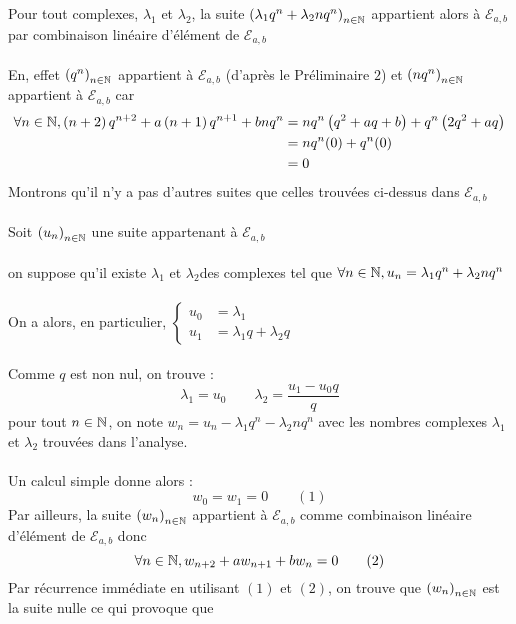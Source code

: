\begin{dem}
\begin{itemize}
        Pour tout complexes, \(\lambda_1\) et \(\lambda_2\), la suite \(\left(\lambda_1 q^n + \lambda_2 n q^n\right)_{n \in \mathbb{N}}\) appartient alors à \(\mathcal{E}_{a,b}\) par combinaison linéaire d'élément de \(\mathcal{E}_{a,b}\)\\~\\
        En, effet \(\left(q^n\right)_{n\in \mathbb{N}}\) appartient à \(\mathcal{E}_{a,b}\) (d'après le Préliminaire \(2\)) et \(\left(nq^n\right)_{n \in \mathbb{N}}\) appartient à \(\mathcal{E}_{a,b}\) car 
        \begin{align*}
            \forall n \in \mathbb{N}, \left(n+2\right)q^{n+2}+a\left(n+1\right)q^{n+1} + bnq^n &= nq^n\left(q^2+aq+b\right) + q^n\left(2q^2+aq\right) \\
            &= nq^n(0)+q^n(0) \\
            &=0
        \end{align*}
        Montrons qu'il n'y a pas d'autres suites que celles trouvées ci-dessus dans \(\mathcal{E}_{a,b}\) \\~\\
        Soit \(\left(u_n\right)_{n \in \mathbb{N}}\) une suite appartenant à \(\mathcal{E}_{a,b}\)\\~\\
        \analyse on suppose qu'il existe \(\lambda_1\) et \(\lambda_2\)des complexes tel que \(\forall n \in \mathbb{N}, u_n = \lambda_1q^n + \lambda_2nq^n\)\\~\\
        On a alors, en particulier, \(\begin{cases}
            u_0 &= \lambda_1 \\
            u_1 &= \lambda_1q+\lambda_2q
        \end{cases}\)\\~\\
        Comme \(q\) est non nul, on trouve :
        \[\lambda_1 = u_0 \qquad \lambda_2 = \frac{u_1-u_0q}{q}\]
        \synthese pour tout \(n \in \mathbb{N}\), on note \(w_n = u_n-\lambda_1 q^n - \lambda_2 n q^n\) avec les nombres complexes \(\lambda_1\) et \(\lambda_2\) trouvées dans l'analyse. \\~\\
        Un calcul simple donne alors :\[w_0 = w_1 =0 \qquad (1)\]
        Par ailleurs, la suite \(\left(w_n\right)_{n\in \mathbb{N}}\) appartient à \(\mathcal{E}_{a,b}\) comme combinaison linéaire d'élément de \(\mathcal{E}_{a,b}\) donc 
        \[\forall n \in \mathbb{N},w_{n+2}+a w_{n+1}+bw_n = 0 \qquad (2)\]
        Par récurrence immédiate en utilisant \((1)\) et \((2)\), on trouve que \(\left(w_n\right)_{n\in \mathbb{N}}\) est la suite nulle ce qui provoque que 

\end{itemize}
\end{dem}
